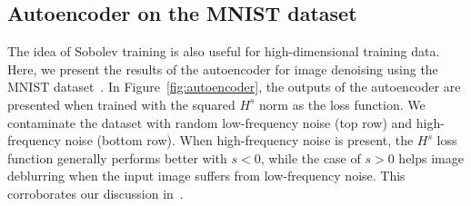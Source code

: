 \documentclass{article} %
\begin{document}
\subsection{Autoencoder on the MNIST dataset}\label{sec:test3}
The idea of Sobolev training is also useful for high-dimensional training data. Here, we present the results of the autoencoder for image denoising using the MNIST dataset~\cite{MNIST}. In Figure~\ref{fig:autoencoder}, the outputs of the autoencoder are presented when trained with the squared $H^s$ norm as the loss function. We contaminate the dataset with random low-frequency noise (top row) and high-frequency noise (bottom row). When high-frequency noise is present, the $H^{s}$ loss function generally performs better with $s < 0$, while the case of $s > 0$ helps image deblurring when the input image suffers from low-frequency noise. This corroborates our discussion in~.






\end{document}
